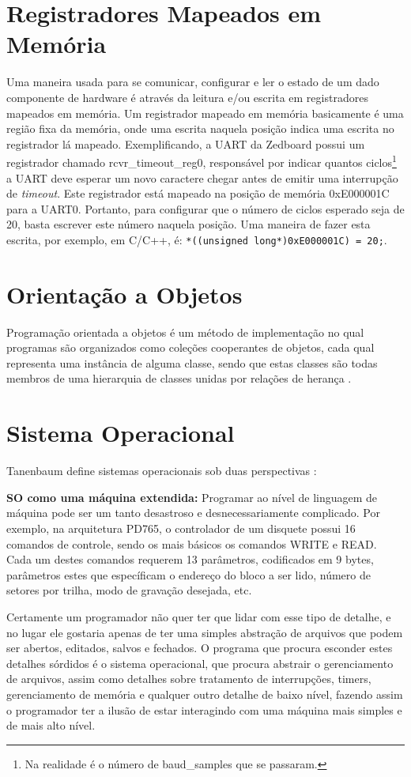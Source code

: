 \section{Registradores Mapeados em Memória}
Uma maneira usada para se comunicar, configurar e ler o estado de um dado componente de hardware é através da leitura e/ou escrita em registradores mapeados em memória. Um registrador mapeado em memória basicamente é uma região fixa da memória, onde uma escrita naquela posição indica uma escrita no registrador lá mapeado.
Exemplificando, a UART da Zedboard possui um registrador chamado rcvr\_timeout\_reg0, responsável por indicar quantos ciclos\footnote{Na realidade é o número de baud\_samples que se passaram.} a UART deve esperar um novo caractere chegar antes de emitir uma interrupção de \emph{timeout}. Este registrador está mapeado na posição de memória 0xE000001C para a UART0. Portanto, para configurar que o número de ciclos esperado seja de 20, basta escrever este número naquela posição. Uma maneira de fazer esta escrita, por exemplo, em C/C++, é: \verb+*((unsigned long*)0xE000001C) = 20;+.

\section{Orientação a Objetos}
Programação orientada a objetos é um método de implementação no qual programas são organizados como coleções cooperantes de objetos, cada qual representa uma instância de alguma classe, sendo que estas classes são todas membros de uma hierarquia de classes unidas por relações de herança \cite{OOAD}.

\section{Sistema Operacional}
Tanenbaum define sistemas operacionais sob duas perspectivas \cite{tanenbaum}:

\textbf{SO como uma máquina extendida:}
Programar ao nível de linguagem de máquina pode ser um tanto desastroso e desnecessariamente complicado. Por exemplo, na arquitetura PD765, o controlador de um disquete possui 16 comandos de controle, sendo os mais básicos os comandos WRITE e READ. Cada um destes comandos requerem 13 parâmetros, codificados em 9 bytes, parâmetros estes que específicam o endereço do bloco a ser lido, número de setores por trilha, modo de gravação desejada, etc.

Certamente um programador não quer ter que lidar com esse tipo de detalhe, e no lugar ele gostaria apenas de ter uma simples abstração de arquivos que podem ser abertos, editados, salvos e fechados.
O programa que procura esconder estes detalhes sórdidos é o sistema operacional, que procura abstrair o gerenciamento de arquivos, assim como detalhes sobre tratamento de interrupções, timers, gerenciamento de memória e qualquer outro detalhe de baixo nível, fazendo assim o programador ter a ilusão de estar interagindo com uma máquina mais simples e de mais alto nível.

